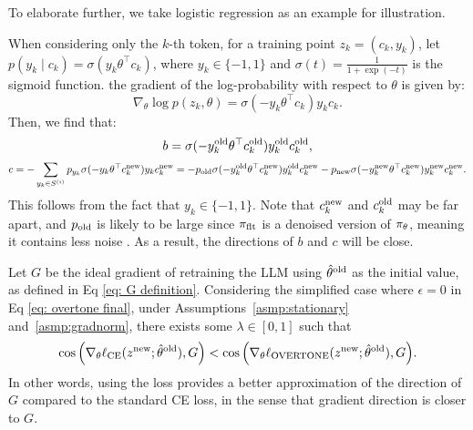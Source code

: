 \begin{remark}
\label{rem: logistic model}
    To elaborate further, we take logistic regression as an example for illustration.

     When considering only the $k$-th token, for a training point \( z_k = (c_k, y_k) \), let \( p(y_k \mid c_k) = \sigma(y_k\theta^\top c_k) \), where \( y_k \in \{-1,1\} \) and \( \sigma(t) = \frac{1}{1 + \exp(-t)} \) is the sigmoid function. 
     the gradient of the log-probability with respect to \( \theta \) is given by:
    \begin{equation*}
        \nabla_\theta \log p(z_k, \theta) = \sigma(-y_k\theta^\top c_k)y_k c_k.
    \end{equation*}
    Then, we find that:
    \begin{equation*}
        b = \sigma(-y_k^{\text{old}} \theta^\top c_k^{\text{old}} )y_k^{\text{old}} c_k^{\text{old}},
    \end{equation*}
    \begin{equation*}
        c = -\sum_{y_k \in S^{(i)}} p_{y_k} \sigma(-y_k\theta^\top c_k^{\text{new}}) y_k c_k^{\text{new}} 
        = - p_{\text{old}} \sigma(-y_k^{\text{old}} \theta^\top c_k^{\text{new}})y_k^{\text{old}} c_k^{\text{new}} - p_{\text{new}} \sigma(-y_k^{\text{new}} \theta^\top c_k^{\text{new}})y_k^{\text{new}} c_k^{\text{new}}.
    \end{equation*}
    This follows from the fact that \( y_k \in \{-1,1\} \). Note that \( c_k^{\text{new}} \) and \( c_k^{\text{old}} \) may be far apart, and \( p_{\text{old}} \) is likely to be large since \( \pi_\text{flt} \) is a denoised version of \( \pi_\theta \), meaning it contains less noise \citep{tang2024top}. As a result, the directions of \( b \) and \( c \) will be close.
\end{remark}

\begin{theorem}
\label{thm:opt-direct}
    Let $G$ be the ideal gradient of retraining the LLM using $\hat{\theta}^{\text{old}}$ as the initial value, as defined in Eq \eqref{eq: G definition}.
    Considering the simplified case where $\epsilon = 0$ in Eq \eqref{eq: overtone final}, under Assumptions~\ref{asmp:stationary} and~\ref{asmp:gradnorm}, 
    there exists some $\lambda \in [0,1]$ such that
    \begin{equation*}
        \cos \qty( \nabla_\theta \ell_{\text{CE}} (z^{\text{new}}; \hat{\theta}^{\text{old}}), G ) < \cos \qty( \nabla_\theta \ell_{\text{OVERTONE}} (z^{\text{new}}; \hat{\theta}^{\text{old}}), G ).
    \end{equation*}
    In other words, using the {\NAME} loss provides a better approximation of the direction of $G$ compared to the standard CE loss, in the sense that {\NAME} gradient direction is closer to $G$. %
\end{theorem}


